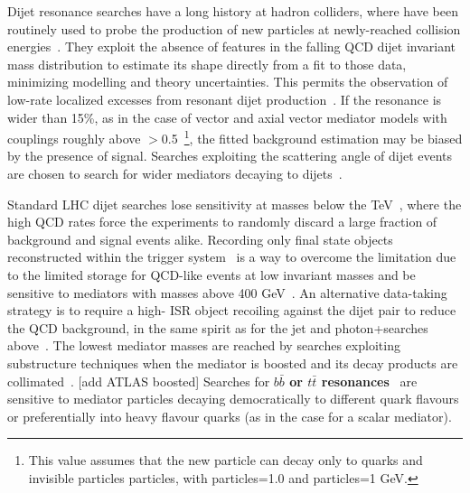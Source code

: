 Dijet resonance searches have a long history at hadron colliders, where have been routinely used to probe the production of new particles at newly-reached collision energies~\cite{Harris:2011bh}. 
They exploit the absence of features in the falling QCD dijet invariant mass distribution to estimate its shape directly from a fit to those data, minimizing modelling and theory uncertainties. This permits the observation of low-rate localized excesses from resonant dijet production~\cite{Aaboud:2017yvp,CMS-PAS-EXO-16-056}. If the resonance is wider than 15\%, as in the case of 
vector and axial vector mediator models with couplings roughly above \gq$>$0.5~\footnote{This value
assumes that the new particle can decay only to quarks and invisible particles particles, with \ginvisible particles=1.0 and \minvisible particles=1 GeV.}, the fitted background estimation may be biased by the presence of signal. Searches exploiting 
the scattering angle of dijet events are chosen to search for wider mediators decaying to dijets~\cite{CMS-PAS-EXO-16-046,Aaboud:2017yvp}. 



Standard LHC dijet searches lose sensitivity at masses below the TeV~\cite{An:2012ue,Dobrescu:2013coa}, where the high QCD rates force the experiments to randomly discard a large fraction of background and signal events alike. 
Recording only final state objects reconstructed within the trigger system~\cite{Aaij:2016rxn,CMS-PAS-EXO-16-056,Aaboud:2016leb} is a way to overcome the limitation due to the limited storage for QCD-like events at low invariant masses and be sensitive to mediators with masses
above 400 GeV~\cite{CMS-PAS-EXO-16-056,ATLAS:2016xiv}. 
An alternative data-taking strategy is to require a high-\pt{} ISR object recoiling against the dijet pair to reduce the QCD background, in the same spirit as for the jet and photon+\MET searches above~\cite{ATLAS:2016bvn,Sirunyan:2017nvi}. The lowest mediator masses are reached by searches exploiting substructure techniques when the mediator is boosted and its decay products are collimated~\cite{Sirunyan:2017nvi}.
[add ATLAS boosted]
Searches for \textbf{$b\bar{b}$ or $t\bar{t}$ resonances}~\cite{lowMassDiB,CMS-PAS-HIG-16-025,Aaboud:2017hnm} are sensitive to
mediator particles decaying democratically to different quark flavours or preferentially into heavy flavour quarks (as in the case for a scalar mediator).

